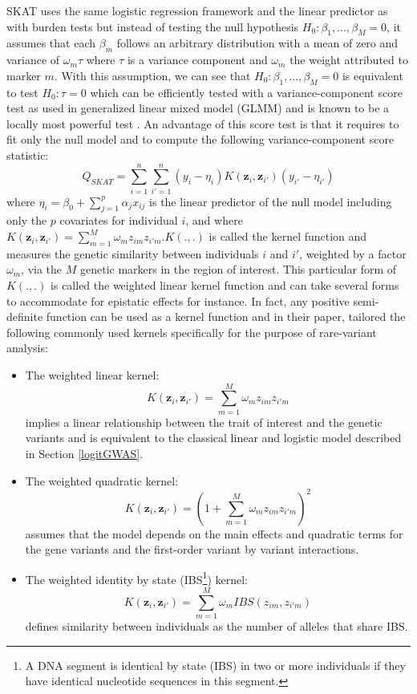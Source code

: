 \documentclass[]{book}
\begin{document}
SKAT uses the same logistic regression framework and the linear
predictor as with burden tests but instead of testing the null
hypothesis \(H_0: \beta_1, \dots, \beta_M = 0\), it assumes that each
\(\beta_m\) follows an arbitrary distribution with a mean of zero and
variance of \(\omega_m \tau\) where \(\tau\) is a variance component and
\(\omega_m\) the weight attributed to marker \(m\). With this assumption, we
can see that \(H_0: \beta_1, \dots, \beta_M = 0\) is equivalent to test
\(H_0: \tau = 0\) which can be efficiently tested with a
variance-component score test as used in generalized linear mixed model
(GLMM) and is known to be a locally most powerful test
\citep{lin1997variance}. An advantage of this score test is that it requires
to fit only the null model and to compute the following
variance-component score statistic:
\[Q_{SKAT} = \sum_{i=1}^n \sum_{i'=1}^n (y_i - \eta_i) K(\mathbf{z}_i,\mathbf{z}_{i'}) (y_{i'} - \eta_{i'})\]
where \(\eta_i = \beta_0 + \sum_{j=1}^p \alpha_j x_{ij}\) is the linear
predictor of the null model including only the \(p\) covariates for
individual \(i\), and where
\(K(\mathbf{z}_{i},\mathbf{z}_{i'}) = \sum_{m=1}^M \omega_m z_{im} z_{i'm}.K(.,.)\)
is called the kernel function and measures the genetic similarity
between individuals \(i\) and \(i'\), weighted by a factor \(\omega_m\), via
the \(M\) genetic markers in the region of interest. This particular form
of \(K(.,.)\) is
called the weighted linear kernel function and can take several forms to
accommodate for epistatic effects for instance. In fact, any positive
semi-definite function can be used as a kernel function and in their
paper, \citep{wu_rare-variant_2011} tailored the following commonly used
kernels specifically for the purpose of rare-variant analysis:

\begin{itemize}
\item
  The weighted linear kernel:
  \[K(\mathbf{z}_{i},\mathbf{z}_{i'}) = \sum_{m=1}^M \omega_m z_{im} z_{i'm}\]
  implies a linear relationship between the trait of interest and the
  genetic variants and is equivalent to the classical linear and
  logistic model described in Section \ref{logitGWAS}.
\item
  The weighted quadratic kernel:
  \[K(\mathbf{z}_{i},\mathbf{z}_{i'}) = (1 + \sum_{m=1}^M \omega_m z_{im} z_{i'm})^2\]
  assumes that the model depends on the main effects and quadratic
  terms for the gene variants and the first-order variant by variant
  interactions.
\item
  The weighted identity by state (IBS\footnote{A DNA segment is identical by state (IBS) in two or more
    individuals if they have identical nucleotide sequences in this
    segment.}) kernel:
  \[K(\mathbf{z}_{i},\mathbf{z}_{i'}) = \sum_{m=1}^M \omega_m IBS(z_{im},z_{i'm})\]
  defines similarity between individuals as the number of alleles that
  share IBS.
\end{itemize}
\end{document}
